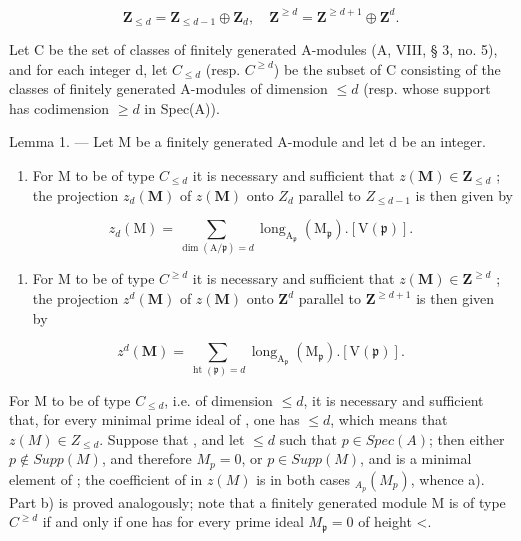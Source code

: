 \[
\mathbf {Z} _ {\leqslant d} = \mathbf {Z} _ {\leqslant d - 1} \oplus \mathbf {Z} _ {d}, \quad \mathbf {Z} ^ {\geqslant d} = \mathbf {Z} ^ {\geqslant d + 1} \oplus \mathbf {Z} ^ {d}.
\]

Let C be the set of classes of finitely generated A-modules (A, VIII, § 3, no. 5), and for each integer d, let \(C_{\leq d}\) (resp. \(C^{\geq d}\)) be the subset of C consisting of the classes of finitely generated A-modules of dimension \(\leq d\) (resp. whose support has codimension \(\geq d\) in Spec(A)).

Lemma 1. --- Let M be a finitely generated A-module and let d be an integer.

\begin{enumerate}
\def\labelenumi{\alph{enumi})}
\tightlist
\item
  For M to be of type \(C_{\leq d}\) it is necessary and sufficient that \(z(\mathbf{M}) \in \mathbf{Z}_{\leq d}\) ; the projection \(z_{d}(\mathbf{M})\) of \(z(\mathbf{M})\) onto \(Z_{d}\) parallel to \(Z_{\leq d-1}\) is then given by
\end{enumerate}

\[
z _ {d} (\mathrm{M}) = \sum _ {\dim (\mathrm{A} / \mathfrak {p}) = d} \operatorname{long} _ {\mathrm{A} _ {\mathfrak {p}}} (\mathrm{M} _ {\mathfrak {p}}). [ \mathrm{V} (\mathfrak {p}) ].
\]

\begin{enumerate}
\def\labelenumi{\alph{enumi})}
\setcounter{enumi}{1}
\tightlist
\item
  For M to be of type \(C^{\geq d}\) it is necessary and sufficient that \(z(\mathbf{M})\in\mathbf{Z}^{\geq d}\) ; the projection \(z^{d}(\mathbf{M})\) of \(z(\mathbf{M})\) onto \(\mathbf{Z}^{d}\) parallel to \(\mathbf{Z}^{\geq d+1}\) is then given by
\end{enumerate}

\[
z ^ {d} (\mathbf {M}) = \sum _ {\operatorname{ht} (\mathfrak {p}) = d} \operatorname{long} _ {\mathrm{A} _ {\mathfrak {p}}} (\mathrm{M} _ {\mathfrak {p}}). [ \mathrm{V} (\mathfrak {p}) ].
\]

For M to be of type \(C_{\leq d}\), i.e. of dimension \(\leq d\), it is necessary and sufficient that, for every minimal prime ideal  of , one has \(\leq d\), which means that \(z(M) \in Z_{\leq d}\). Suppose that , and let \(\leq d\) such that \(p \in Spec(A)\); then either \(p \notin Supp(M)\), and therefore \(M_p = 0\), or \(p \in Supp(M)\), and { is a minimal element of }; the coefficient of {} in \(z(M)\) is in both cases \(_{A_p}(M_p)\), whence a). Part b) is proved analogously; note that a finitely generated module M is of type \(C^{\geq d}\) if and only if one has  for every prime ideal \(M_{\mathfrak{p}} = 0\) of height \textless{}.

